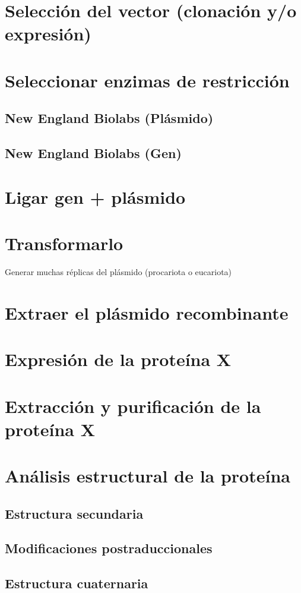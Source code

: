 \documentclass[12pt]{article}
\begin{document}
	\section{Selecci\'on del vector (clonaci\'on y/o expresi\'on)}
	\section{Seleccionar enzimas de restricci\'on}
		\subsection{New England Biolabs (Pl\'asmido)}
		\subsection{New England Biolabs (Gen)}
	\section{Ligar gen + pl\'asmido}
	\section{Transformarlo}
		Generar muchas r\'eplicas del pl\'asmido (procariota o eucariota)
	\section{Extraer el pl\'asmido recombinante}
	\section{Expresi\'on de la prote\'ina X}
	\section{Extracci\'on y purificaci\'on de la prote\'ina X}
	\section{An\'alisis estructural de la prote\'ina}
		\subsection{Estructura secundaria}
		\subsection{Modificaciones postraduccionales}
		\subsection{Estructura cuaternaria}
	
%	
	
\end{document}
